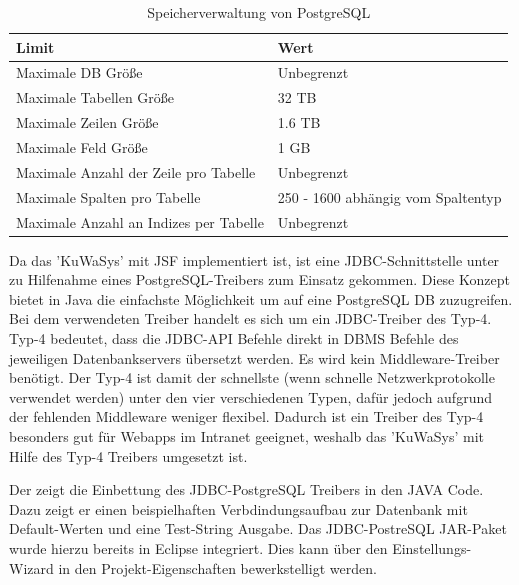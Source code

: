 \documentclass[12pt, twoside, a4paper, ngerman]{article}
\begin{document}
\begin{table}[H]
\begin{center}
	\begin{tabular}{|l|l|}\hline
		\textbf{Limit} & \textbf{Wert} \\ \hline	
		Maximale DB Größe & Unbegrenzt \\ \hline \hline
		Maximale Tabellen Größe & 32 TB \\ \hline \hline
		Maximale Zeilen Größe & 1.6 TB \\ \hline \hline
		Maximale Feld Größe & 1 GB \\ \hline \hline	
		Maximale Anzahl der Zeile pro Tabelle & Unbegrenzt \\ \hline \hline
		Maximale Spalten pro Tabelle &	250 - 1600 abhängig vom Spaltentyp \\ \hline \hline
		Maximale Anzahl an Indizes per Tabelle & Unbegrenzt \\ \hline \hline
	\end{tabular}
	\caption{Speicherverwaltung von PostgreSQL}
	\label{tab:PostgreSQLValues}
\end{center}
\end{table}

Da das 'KuWaSys' mit JSF implementiert ist, ist eine \gls{JDBC}-Schnittstelle unter zu Hilfenahme eines PostgreSQL-Treibers zum Einsatz gekommen. Diese Konzept bietet in Java die einfachste Möglichkeit um auf eine PostgreSQL \ac{DB} zuzugreifen. Bei dem verwendeten Treiber handelt es sich um ein JDBC-Treiber des Typ-4. 
Typ-4 bedeutet, dass die JDBC-API Befehle direkt in \ac{DBMS} Befehle des jeweiligen Datenbankservers übersetzt werden.
Es wird kein Middleware-Treiber benötigt. 
Der Typ-4 ist damit der schnellste (wenn schnelle Netzwerkprotokolle verwendet werden) unter den vier verschiedenen Typen, dafür jedoch aufgrund der fehlenden Middleware weniger flexibel.
Dadurch ist ein Treiber des Typ-4 besonders gut für Webapps im Intranet geeignet, weshalb das 'KuWaSys' mit Hilfe des Typ-4 Treibers umgesetzt ist.

Der  zeigt die Einbettung des JDBC-PostgreSQL Treibers in den JAVA Code. Dazu zeigt er einen beispielhaften Verbdindungsaufbau zur Datenbank mit Default-Werten und eine Test-String Ausgabe. Das JDBC-PostreSQL \gls{JAR}-Paket wurde hierzu bereits in Eclipse integriert. Dies kann über den Einstellungs-Wizard in den Projekt-Eigenschaften bewerkstelligt werden. 

	
\end{document}
